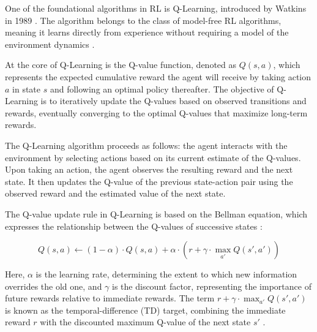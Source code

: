 One of the foundational algorithms in RL is Q-Learning, introduced by Watkins in 1989 \cite{watkins1989learning}. The algorithm belongs to the class of model-free RL algorithms, meaning it learns directly from experience without requiring a model of the environment dynamics \cite{russel2020ai}.

At the core of Q-Learning is the Q-value function, denoted as $Q(s, a)$, which represents the expected cumulative reward the agent will receive by taking action $a$ in state $s$ and following an optimal policy thereafter. The objective of Q-Learning is to iteratively update the Q-values based on observed transitions and rewards, eventually converging to the optimal Q-values that maximize long-term rewards.

The Q-Learning algorithm proceeds as follows: the agent interacts with the environment by selecting actions based on its current estimate of the Q-values. Upon taking an action, the agent observes the resulting reward and the next state. It then updates the Q-value of the previous state-action pair using the observed reward and the estimated value of the next state.

The Q-value update rule in Q-Learning is based on the Bellman equation, which expresses the relationship between the Q-values of successive states \cite{russel2020ai}:

\[
Q(s, a) \leftarrow (1 - \alpha) \cdot Q(s, a) + \alpha \cdot \left( r + \gamma \cdot \max_{a'} Q(s', a') \right)
\]

Here, $\alpha$ is the learning rate, determining the extent to which new information overrides the old one, and $\gamma$ is the discount factor, representing the importance of future rewards relative to immediate rewards. The term $r + \gamma \cdot \max_{a'} Q(s', a')$ is known as the temporal-difference (TD) target, combining the immediate reward $r$ with the discounted maximum Q-value of the next state $s'$ \cite{russel2020ai}.



